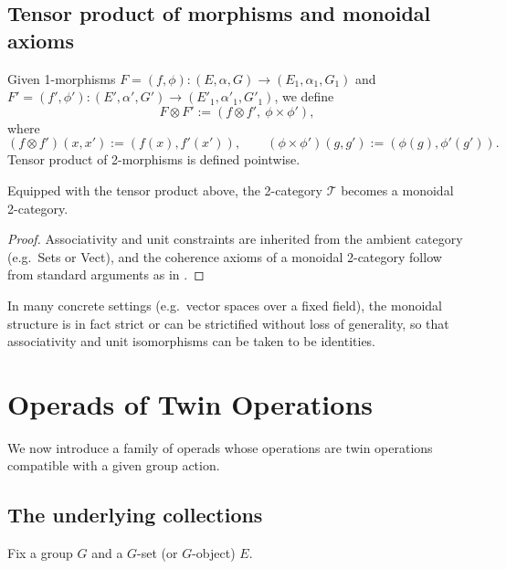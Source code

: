 \documentclass[11pt,a4paper]{article}
\numberwithin{equation}{section}
\newcommand{\TwinSpace}{(E,\alpha,G)}
\newcommand{\Twin}{\mathcal{T}}
\begin{document}
	\subsection{Tensor product of morphisms and monoidal axioms}
	
	\begin{definition}
		Given 1-morphisms $F=(f,\phi):\TwinSpace\to (E_1,\alpha_1,G_1)$
		and $F'=(f',\phi'):(E',\alpha',G')\to (E'_1,\alpha'_1,G'_1)$, we define
		\[
		F\otimes F' := (f\otimes f',\ \phi\times \phi'),
		\]
		where
		\[
		(f\otimes f')(x,x') := (f(x),f'(x')),\qquad
		(\phi\times\phi')(g,g') := (\phi(g),\phi'(g')).
		\]
		Tensor product of 2-morphisms is defined pointwise.
	\end{definition}
	
	\begin{theorem}\label{thm:Twin-monoidal}
		Equipped with the tensor product above, the 2-category $\Twin$ becomes a monoidal 2-category.
	\end{theorem}
	
	\begin{proof}
		Associativity and unit constraints are inherited from the ambient category (e.g.\ Sets or Vect),
		and the coherence axioms of a monoidal 2-category follow from standard arguments as in 
		\cite{MacLane1998,Leinster2004}.
	\end{proof}
	
	\begin{remark}
		In many concrete settings (e.g.\ vector spaces over a fixed field), the monoidal structure is in fact strict
		or can be strictified without loss of generality, so that associativity and unit isomorphisms can be taken
		to be identities.
	\end{remark}
	
	\section{Operads of Twin Operations}
	\label{sec:operads}
	
	We now introduce a family of operads whose operations are twin operations compatible with a given group action.
	
	\subsection{The underlying collections}
	
	Fix a group $G$ and a $G$-set (or $G$-object) $E$.
	
\end{document}
